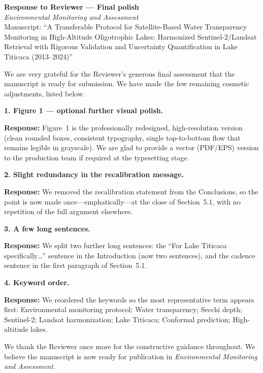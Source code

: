 \documentclass[11pt]{article}
\newcommand{\resp}[1]{\par\noindent\textcolor{blue!60!black}{\textbf{Response:}} #1\par\medskip}
\begin{document}
\begin{center}
{\large\textbf{Response to Reviewer --- Final polish}}\\[0.3em]
\textit{Environmental Monitoring and Assessment}\\[0.2em]
Manuscript: ``A Transferable Protocol for Satellite-Based Water Transparency
Monitoring in High-Altitude Oligotrophic Lakes: Harmonized Sentinel-2/Landsat
Retrieval with Rigorous Validation and Uncertainty Quantification in Lake Titicaca
(2013--2024)''
\end{center}

We are very grateful for the Reviewer's generous final assessment that the
manuscript is ready for submission. We have made the few remaining cosmetic
adjustments, listed below.

\hrulefill

\textbf{1. Figure 1 --- optional further visual polish.}
\resp{Figure~1 is the professionally redesigned, high-resolution version (clean
rounded boxes, consistent typography, single top-to-bottom flow that remains legible
in grayscale). We are glad to provide a vector (PDF/EPS) version to the production
team if required at the typesetting stage.}

\textbf{2. Slight redundancy in the recalibration message.}
\resp{We removed the recalibration statement from the Conclusions, so the point is
now made once---emphatically---at the close of Section~5.1, with no repetition of the
full argument elsewhere.}

\textbf{3. A few long sentences.}
\resp{We split two further long sentences: the ``For Lake Titicaca specifically\ldots''
sentence in the Introduction (now two sentences), and the cadence sentence in the
first paragraph of Section~5.1.}

\textbf{4. Keyword order.}
\resp{We reordered the keywords so the most representative term appears first:
Environmental monitoring protocol; Water transparency; Secchi depth; Sentinel-2;
Landsat harmonization; Lake Titicaca; Conformal prediction; High-altitude lakes.}

\hrulefill

We thank the Reviewer once more for the constructive guidance throughout. We believe
the manuscript is now ready for publication in \textit{Environmental Monitoring and
Assessment}.
\end{document}

